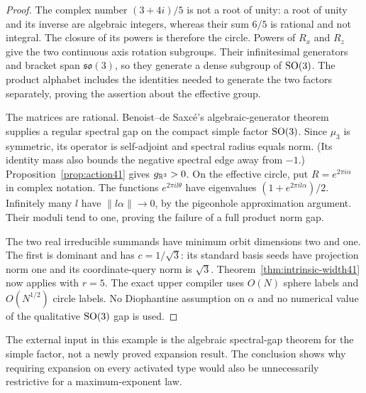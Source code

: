 \begin{proof}
The complex number $(3+4i)/5$ is not a root of unity: a root of unity
and its inverse are algebraic integers, whereas their sum $6/5$ is
rational and not integral. The closure of its powers is therefore the
circle. Powers of $R_x$ and $R_z$ give the two continuous axis rotation
subgroups. Their infinitesimal generators and bracket span
$\mathfrak{so}(3)$, so they generate a dense subgroup of $\operatorname{SO}(3)$.
The product alphabet includes the identities needed to generate the two
factors separately, proving the assertion about the effective group.

The matrices are rational. Benoist--de Saxc\'e's algebraic-generator
theorem \cite[Theorem 1.2]{BdS} supplies a regular spectral gap on the
compact simple factor $\operatorname{SO}(3)$. Since $\mu_3$ is symmetric, its
operator is self-adjoint and spectral radius equals norm. (Its identity
mass also bounds the negative spectral edge away from $-1$.)
Proposition~\ref{prop:action41} gives $g_{\mathbb R^3}>0$.
On the effective circle, put $R=e^{2\pi i\alpha}$ in complex notation.
The functions $e^{2\pi i l\theta}$ have eigenvalues
$(1+e^{2\pi i l\alpha})/2$. Infinitely many $l$ have
$\|l\alpha\|\to0$, by the pigeonhole approximation argument. Their
moduli tend to one, proving the failure of a full product norm gap.

The two real irreducible summands have minimum orbit dimensions two
and one. The first is dominant and has $c=1/\sqrt3$: its standard
basis seeds have projection norm one and its coordinate-query norm
is $\sqrt3$. Theorem~\ref{thm:intrinsic-width41} now applies with
$r=5$. The exact upper compiler uses $O(N)$ sphere labels and
$O(N^{1/2})$ circle labels. No Diophantine assumption on $\alpha$ and
no numerical value of the qualitative $\operatorname{SO}(3)$ gap is used.
\end{proof}

The external input in this example is the algebraic spectral-gap theorem
for the simple factor, not a newly proved expansion result. The conclusion
shows why requiring expansion on every activated type would also be
unnecessarily restrictive for a maximum-exponent law.
